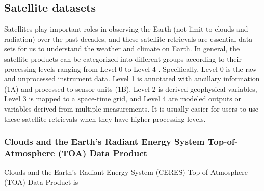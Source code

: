 \subsection{Satellite datasets}
Satellites play important roles in observing the Earth (not limit to clouds and radiation) over the past decades, and these satellite retrievals are essential data sets for us to understand the weather and climate on Earth. In general, the satellite products can be categorized into different groups according to their processing levels ranging from Level 0 to Level 4 \citep{Parkinson2006earth}. Specifically, Level 0 is the raw and unprocessed instrument data. Level 1 is annotated with ancillary information (1A) and processed to sensor units (1B). Level 2 is derived geophysical variables, Level 3 is mapped to a space-time grid, and Level 4 are modeled outputs or variables derived from multiple measurements. It is usually easier for users to use these satellite retrievals when they have higher processing levels.




\subsubsection{Clouds and the Earth’s Radiant Energy System  Top-of-Atmosphere (TOA) Data Product}
Clouds and the Earth’s Radiant Energy System (CERES) Top-of-Atmosphere (TOA) Data Product is

